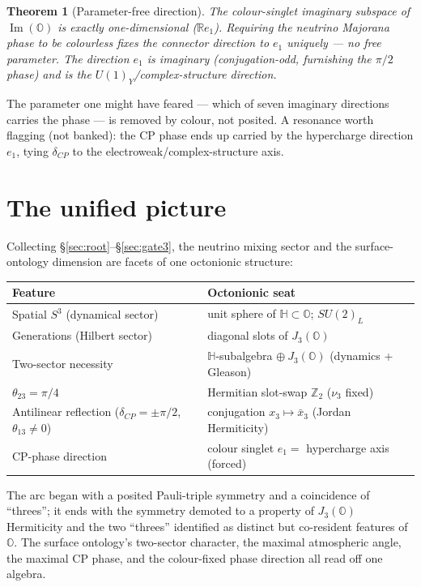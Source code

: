\documentclass[11pt]{article}
\newtheorem{theorem}{Theorem}
\theoremstyle{definition}
\newcommand{\OO}{\mathbb{O}}
\newcommand{\HH}{\mathbb{H}}
\newcommand{\RR}{\mathbb{R}}
\newcommand{\Imag}{\operatorname{Im}}
\newcommand{\JthreeO}{J_3(\OO)}
\begin{document}
\begin{theorem}[Parameter-free direction]
The colour-singlet imaginary subspace of $\Imag(\OO)$ is exactly one-dimensional ($\RR e_1$). Requiring the neutrino Majorana phase to be colourless fixes the connector direction to $e_1$ uniquely --- no free parameter. The direction $e_1$ is imaginary (conjugation-odd, furnishing the $\pi/2$ phase) and is the $U(1)_Y$/complex-structure direction.
\end{theorem}

\noindent The parameter one might have feared --- which of seven imaginary directions carries the phase --- is removed by colour, not posited. A resonance worth flagging (not banked): the CP phase ends up carried by the hypercharge direction $e_1$, tying $\delta_{CP}$ to the electroweak/complex-structure axis.

\section{The unified picture}\label{sec:unified}

Collecting \S\ref{sec:root}--\S\ref{sec:gate3}, the neutrino mixing sector and the surface-ontology dimension are facets of one octonionic structure:

\begin{center}
\begin{tabular}{ll}
\toprule
Feature & Octonionic seat \\
\midrule
Spatial $S^3$ (dynamical sector) & unit sphere of $\HH\subset\OO$; $SU(2)_L$ \\
Generations (Hilbert sector) & diagonal slots of $\JthreeO$ \\
Two-sector necessity & $\HH$-subalgebra $\oplus\ \JthreeO$ (dynamics + Gleason) \\
$\theta_{23}=\pi/4$ & Hermitian slot-swap $\mathbb{Z}_2$ ($\nu_3$ fixed) \\
Antilinear reflection ($\delta_{CP}=\pm\pi/2$, $\theta_{13}\neq0$) & conjugation $x_3\mapsto\bar{x}_3$ (Jordan Hermiticity) \\
CP-phase direction & colour singlet $e_1=$ hypercharge axis (forced) \\
\bottomrule
\end{tabular}
\end{center}

\noindent The arc began with a posited Pauli-triple symmetry and a coincidence of ``threes''; it ends with the symmetry demoted to a property of $\JthreeO$ Hermiticity and the two ``threes'' identified as distinct but co-resident features of $\OO$. The surface ontology's two-sector character, the maximal atmospheric angle, the maximal CP phase, and the colour-fixed phase direction all read off one algebra.
\end{document}
